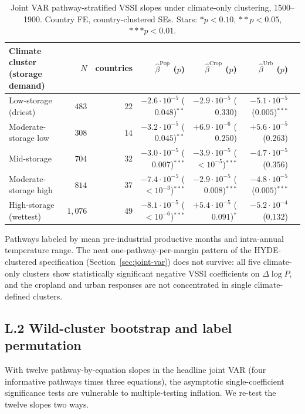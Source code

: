 \documentclass[11pt,letterpaper]{article}
\begin{document}
\begin{table}[H]
\centering
\caption{Joint VAR pathway-stratified VSSI slopes under climate-only clustering, 1500--1900. Country FE, country-clustered SEs. Stars: $* p<0.10$, $** p<0.05$, $*** p<0.01$.}
\label{tab:joint-var-climate}
\small
\begin{tabular}{lrrrrrr}
\toprule
Climate cluster (storage demand) & $N$ & countries & $\hat\beta^{\text{Pop}}$ ($p$) & $\hat\beta^{\text{Crop}}$ ($p$) & $\hat\beta^{\text{Urb}}$ ($p$) \\
\midrule
Low-storage (driest)    & $483$  & $22$ & $-2.6\!\cdot\!10^{-5}$ ($0.048$)$^{**}$  & $-2.9\!\cdot\!10^{-5}$ ($0.330$)         & $-5.1\!\cdot\!10^{-5}$ ($0.005$)$^{***}$ \\
Moderate-storage low    & $308$  & $14$ & $-3.2\!\cdot\!10^{-5}$ ($0.045$)$^{**}$  & $+6.9\!\cdot\!10^{-6}$ ($0.250$)         & $+5.6\!\cdot\!10^{-5}$ ($0.263$)         \\
Mid-storage             & $704$  & $32$ & $-3.0\!\cdot\!10^{-5}$ ($0.007$)$^{***}$ & $-3.9\!\cdot\!10^{-5}$ ($<10^{-5}$)$^{***}$ & $-4.7\!\cdot\!10^{-5}$ ($0.356$)      \\
Moderate-storage high   & $814$  & $37$ & $-7.4\!\cdot\!10^{-5}$ ($<10^{-3}$)$^{***}$ & $-2.9\!\cdot\!10^{-5}$ ($0.008$)$^{***}$ & $-4.8\!\cdot\!10^{-5}$ ($0.005$)$^{***}$ \\
High-storage (wettest)  & $1{,}076$ & $49$ & $-8.1\!\cdot\!10^{-5}$ ($<10^{-6}$)$^{***}$ & $+5.4\!\cdot\!10^{-5}$ ($0.091$)$^{*}$  & $-5.2\!\cdot\!10^{-4}$ ($0.132$)         \\
\bottomrule
\end{tabular}
\par\smallskip\footnotesize{Pathways labeled by mean pre-industrial productive months and intra-annual temperature range. The neat one-pathway-per-margin pattern of the HYDE-clustered specification (Section~\ref{sec:joint-var}) does not survive: all five climate-only clusters show statistically significant negative VSSI coefficients on $\Delta \log P$, and the cropland and urban responses are not concentrated in single climate-defined clusters.}
\end{table}


\subsection*{L.2 Wild-cluster bootstrap and label permutation}
\label{app:joint-var-bootstrap}

With twelve pathway-by-equation slopes in the headline joint VAR (four informative pathways times three equations), the asymptotic single-coefficient significance tests are vulnerable to multiple-testing inflation. We re-test the twelve slopes two ways.
\end{document}

